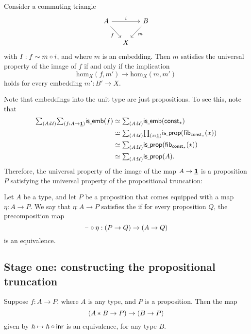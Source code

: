 \begin{cor}\label{cor:image_up}
Consider a commuting triangle
\begin{equation*}
\begin{tikzcd}[column sep=small]
A \arrow[rr,"i"] \arrow[dr,swap,"f"] & & B \arrow[dl,"m"] \\
& X
\end{tikzcd}
\end{equation*}
with $I:f\sim m\circ i$, and where $m$ is an embedding. Then $m$ satisfies the universal property of the image of $f$ if and only if the implication
\begin{equation*}
\mathrm{hom}_X(f,m')\to\mathrm{hom}_X(m,m')
\end{equation*}
holds for every embedding $m':B'\to X$. 
\end{cor}

Note that embeddings into the unit type are just propositions. To see this, note that
\begin{align*}
\sm{A:\UU}{f:A\to\unit}\isemb(f)
& \eqvsym \sm{A:\UU}\isemb(\const_\ttt) \\
& \eqvsym \sm{A:\UU}\prd{x:\unit}\isprop(\fib{\const_\ttt}{x}) \\
& \eqvsym \sm{A:\UU}\isprop(\fib{\const_\ttt}{\ttt}) \\
& \eqvsym \sm{A:\UU}\isprop(A).
\end{align*}
Therefore, the universal property of the image of the map $A\to\underline{\mathbf{1}}$ is a proposition $P$ satisfying the universal property of the propositional truncation:

\begin{defn}
Let $A$ be a type, and let $P$ be a proposition that comes equipped with a map $\eta:A\to P$. We say that $\eta:A\to P$ satisfies the  if for every proposition $Q$, the precomposition map
\begin{equation*}
\mathord{\hspace{1pt}\text{--}\hspace{1pt}}\circ\eta:(P\to Q)\to (A\to Q)
\end{equation*}
is an equivalence.
\end{defn}

\subsection{Stage one: constructing the propositional truncation}

\begin{lem}\label{lem:extend_join_prop}
Suppose $f:A\to P$, where $A$ is any type, and $P$ is a proposition.
Then the map
\begin{equation*}
({A}\ast_{}{B}\to P)\to (B\to P)
\end{equation*}
given by $h\mapsto h\circ {\mathsf{inr}}$ is an equivalence, for any type $B$.
\end{lem}

